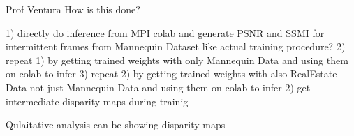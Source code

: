 Prof Ventura How is this done?


1) directly do inference from MPI colab and generate PSNR and SSMI for intermittent frames from Mannequin Dataset like actual training procedure?
2) repeat 1) by getting trained weights with only Mannequin Data and using them on colab to infer  
3) repeat 2) by getting trained weights with also RealEstate Data not just Mannequin Data and using them on colab to infer
2) get intermediate disparity maps during trainig 

Qulaitative analysis can be showing disparity maps 
